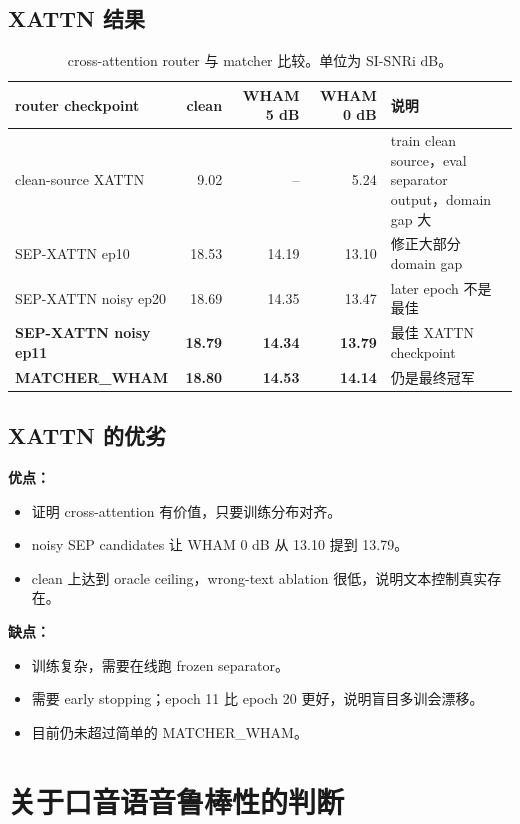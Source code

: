 \documentclass[UTF8,zihao=-4]{ctexart}
\begin{document}
\subsection{XATTN 结果}

\begin{table}[h]
\centering
\begin{tabularx}{\linewidth}{lrrrX}
\toprule
router checkpoint & clean & WHAM 5 dB & WHAM 0 dB & 说明 \\
\midrule
clean-source XATTN & 9.02 & -- & 5.24 & train clean source，eval separator output，domain gap 大 \\
SEP-XATTN ep10 & 18.53 & 14.19 & 13.10 & 修正大部分 domain gap \\
SEP-XATTN noisy ep20 & 18.69 & 14.35 & 13.47 & later epoch 不是最佳 \\
\textbf{SEP-XATTN noisy ep11} & \textbf{18.79} & \textbf{14.34} & \textbf{13.79} & 最佳 XATTN checkpoint \\
\textbf{MATCHER\_WHAM} & \textbf{18.80} & \textbf{14.53} & \textbf{14.14} & 仍是最终冠军 \\
\bottomrule
\end{tabularx}
\caption{cross-attention router 与 matcher 比较。单位为 SI-SNRi dB。}
\end{table}

\subsection{XATTN 的优劣}

\textbf{优点：}
\begin{itemize}
  \item 证明 cross-attention 有价值，只要训练分布对齐。
  \item noisy SEP candidates 让 WHAM 0 dB 从 13.10 提到 13.79。
  \item clean 上达到 oracle ceiling，wrong-text ablation 很低，说明文本控制真实存在。
\end{itemize}

\textbf{缺点：}
\begin{itemize}
  \item 训练复杂，需要在线跑 frozen separator。
  \item 需要 early stopping；epoch 11 比 epoch 20 更好，说明盲目多训会漂移。
  \item 目前仍未超过简单的 MATCHER\_WHAM。
\end{itemize}

\section{关于口音语音鲁棒性的判断}
\end{document}
